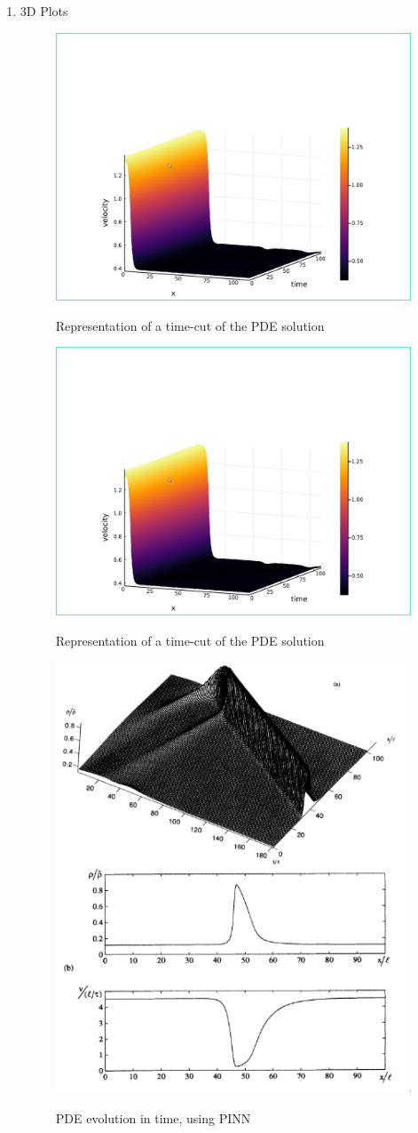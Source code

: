 \documentclass[11pt]{article}
\begin{document}
\begin{enumerate}
\item 3D Plots
\label{sec:orgfd4cd28}

\begin{figure}[!htb]
  \centering
  \caption{\label{fig:sim3} Representation of a time-cut of the PDE solution}
  \includegraphics[width=0.45\linewidth]{Resources/img/Kerner-3d-1.jpeg}
  \\ 
\end{figure}

\begin{figure}[!htb]
  \centering
  \caption{\label{fig:sim3} Representation of a time-cut of the PDE solution}
  \includegraphics[width=0.45\linewidth]{Resources/img/Kerner-3d-1.jpeg}
  \\ 
\end{figure}

\begin{figure}[!htb]
  \centering
  \caption{\label{fig:sim4} PDE evolution in time, using PINN}
  \includegraphics[width=0.4\linewidth]{Resources/img/kerner.png}
  \\ 
\end{figure}
\end{enumerate}
\end{document}
